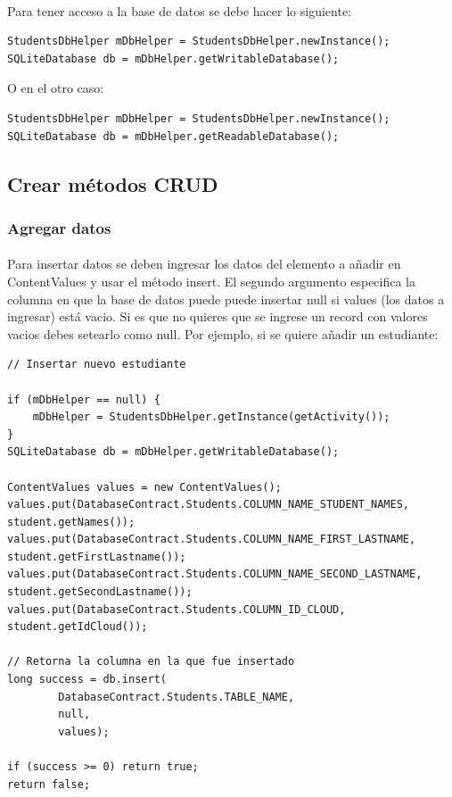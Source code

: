 \documentclass[10pt]{extarticle}
\begin{document}
\paragraph{}
Para tener acceso a la base de datos se debe hacer lo siguiente:
\begin{lstlisting}
StudentsDbHelper mDbHelper = StudentsDbHelper.newInstance();
SQLiteDatabase db = mDbHelper.getWritableDatabase();
\end{lstlisting}
O en el otro caso:
\begin{lstlisting}
StudentsDbHelper mDbHelper = StudentsDbHelper.newInstance();
SQLiteDatabase db = mDbHelper.getReadableDatabase();
\end{lstlisting}

\subsection{Crear métodos CRUD}

\subsubsection{Agregar datos}
\paragraph{}
Para insertar datos se deben ingresar los datos del elemento a añadir en ContentValues y usar el método insert. El segundo argumento especifica la columna en que la base de datos puede puede insertar null si values (los datos a ingresar) está vacio. Si es que no quieres que se ingrese un record con valores vacios debes setearlo como null. Por ejemplo, si se quiere añadir un estudiante:
	
\begin{lstlisting}
// Insertar nuevo estudiante

if (mDbHelper == null) {
    mDbHelper = StudentsDbHelper.getInstance(getActivity());
}
SQLiteDatabase db = mDbHelper.getWritableDatabase();

ContentValues values = new ContentValues();
values.put(DatabaseContract.Students.COLUMN_NAME_STUDENT_NAMES, student.getNames());
values.put(DatabaseContract.Students.COLUMN_NAME_FIRST_LASTNAME, student.getFirstLastname());
values.put(DatabaseContract.Students.COLUMN_NAME_SECOND_LASTNAME, student.getSecondLastname());
values.put(DatabaseContract.Students.COLUMN_ID_CLOUD, student.getIdCloud());

// Retorna la columna en la que fue insertado
long success = db.insert(
        DatabaseContract.Students.TABLE_NAME, 
        null,								  
        values);
        
if (success >= 0) return true;
return false;
     
\end{lstlisting}
\end{document}

